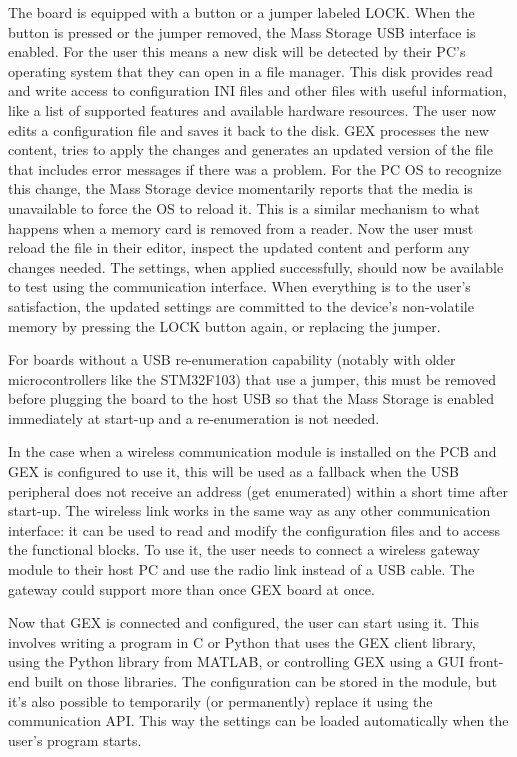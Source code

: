 The board is equipped with a button or a jumper labeled LOCK. When the button is pressed or the jumper removed, the Mass Storage USB interface is enabled. For the user this means a new disk will be detected by their PC's operating system that they can open in a file manager. This disk provides read and write access to configuration INI files and other files with useful information, like a list of supported features and available hardware resources. The user now edits a configuration file and saves it back to the disk. GEX processes the new content, tries to apply the changes and generates an updated version of the file that includes error messages if there was a problem. For the PC OS to recognize this change, the Mass Storage device momentarily reports that the media is unavailable to force the OS to reload it. This is a similar mechanism to what happens when a memory card is removed from a reader. Now the user must reload the file in their editor, inspect the updated content and perform any changes needed. The settings, when applied successfully, should now be available to test using the communication interface. When everything is to the user's satisfaction, the updated settings are committed to the device's non-volatile memory by pressing the LOCK button again, or replacing the jumper. 

For boards without a USB re-enumeration capability (notably with older microcontrollers like the STM32F103) that use a jumper, this must be removed before plugging the board to the host USB so that the Mass Storage is enabled immediately at start-up and a re-enumeration is not needed.

In the case when a wireless communication module is installed on the PCB and GEX is configured to use it, this will be used as a fallback when the USB peripheral does not receive an address (get enumerated) within a short time after start-up. The wireless link works in the same way as any other communication interface: it can be used to read and modify the configuration files and to access the functional blocks. To use it, the user needs to connect a wireless gateway module to their host PC and use the radio link instead of a USB cable. The gateway could support more than once GEX board at once.

Now that GEX is connected and configured, the user can start using it. This involves writing a program in C or Python that uses the GEX client library, using the Python library from MATLAB, or controlling GEX using a GUI front-end built on those libraries. The configuration can be stored in the module, but it's also possible to temporarily (or permanently) replace it using the communication API. This way the settings can be loaded automatically when the user's program starts.

